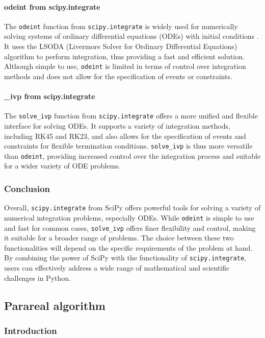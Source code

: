 \documentclass{article}
\begin{document}
   \paragraph{odeint from scipy.integrate}
   The \texttt{odeint} function from \texttt{scipy.integrate} is widely used for numerically solving systems of ordinary differential equations (ODEs) with initial conditions \cite{scipy_ode}. It uses the LSODA (Livermore Solver for Ordinary Differential Equations) algorithm to perform integration, thus providing a fast and efficient solution. Although simple to use, \texttt{odeint} is limited in terms of control over integration methods and does not allow for the specification of events or constraints.
   \paragraph{\_ivp from scipy.integrate}
   The \texttt{solve\_ivp} function from \texttt{scipy.integrate} offers a more unified and flexible interface for solving ODEs. It supports a variety of integration methods, including RK45 and RK23, and also allows for the specification of events and constraints for flexible termination conditions. \texttt{solve\_ivp} is thus more versatile than \texttt{odeint}, providing increased control over the integration process and suitable for a wider variety of ODE problems.
   
   \subsubsection{Conclusion}
   Overall, \texttt{scipy.integrate} from SciPy offers powerful tools for solving a variety of numerical integration problems, especially ODEs. While \texttt{odeint} is simple to use and fast for common cases, \texttt{solve\_ivp} offers finer flexibility and control, making it suitable for a broader range of problems. The choice between these two functionalities will depend on the specific requirements of the problem at hand. By combining the power of SciPy with the functionality of \texttt{scipy.integrate}, users can effectively address a wide range of mathematical and scientific challenges in Python.
   
   \subsection{Parareal algorithm}
   \subsubsection{Introduction}
   
\end{document}
